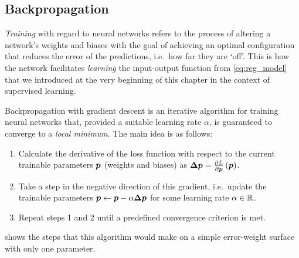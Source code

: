 \documentclass[../report.tex]{subfiles}
\begin{document}
\subsection{Backpropagation}
\emph{Training} with regard to neural networks refers to the process of altering a network's weights and biases with the goal of achieving an optimal configuration that reduces the error of the predictions, i.e.\ how far they are `off'. 
This is how the network facilitates \emph{learning} the input-output function from \cref{eq:reg_model} that we introduced at the very beginning of this chapter in the context of supervised learning.

Backpropagation with gradient descent is an iterative algorithm for training neural networks that, provided a suitable learning rate $\alpha$, is guaranteed to converge to a \emph{local minimum}.
The main idea is as follows:
\begin{enumerate}
    \item Calculate the derivative of the loss function with respect to the current trainable parameters ${\bm{p}}$ (weights and biases) as
        $\bm{\Delta p} = \frac{\partial L}{\partial {\bm{p}}}\left({\bm{p}}\right)$.
    \item Take a step in the negative direction of this gradient, i.e.\ update the trainable parameters ${\bm{p}} \leftarrow {\bm{p}} - \alpha \bm{\Delta p}$ for some learning rate $\alpha \in \mathbb{R}$.
    \item Repeat steps 1 and 2 until a predefined convergence criterion is met.
\end{enumerate}
 shows the steps that this algorithm would make on a simple error-weight surface with only one parameter.
\end{document}
